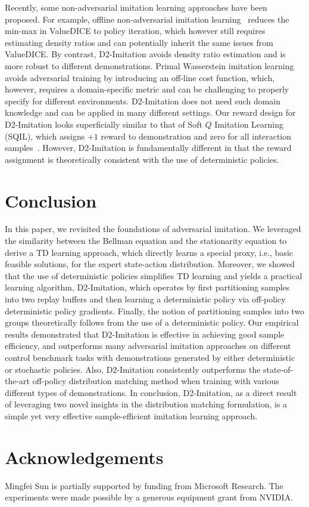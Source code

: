 \documentclass[letterpaper]{article} %
\begin{document}
Recently, some non-adversarial imitation learning approaches have been proposed. 
For example, offline non-adversarial imitation learning~\cite{arenz2020non} reduces the min-max in ValueDICE to policy iteration, 
which however still requires estimating density ratios and can potentially inherit the same issues from ValueDICE.
By contrast, D2-Imitation avoids density ratio estimation and is more robust to different demonstrations. 
Primal Wasserstein imitation learning~\cite{dadashi2020primal} avoids adversarial training by introducing an off-line cost function, 
which, however, requires a domain-specific metric and can be challenging to properly specify for different environments.
D2-Imitation does not need such domain knowledge and can be applied in many different settings.  
Our reward design for D2-Imitation looks superficially similar to that of Soft $Q$ Imitation Learning (SQIL), 
which assigns $+1$ reward to demonstration and zero for all interaction samples~\cite{reddy2019sqil}. 
However, D2-Imitation is fundamentally different in that the reward assignment is theoretically consistent with the use of deterministic policies.


\section{Conclusion}
In this paper, we revisited the foundations of adversarial imitation. 
We leveraged the similarity between the Bellman equation and the stationarity equation to derive a TD learning approach, which directly learns a special proxy, i.e., basic feasible solutions, for the expert state-action distribution. 
Moreover, we showed that the use of deterministic policies simplifies TD learning and yields a practical learning algorithm, 
D2-Imitation, which operates by first partitioning samples into two replay buffers and then learning a deterministic policy via off-policy deterministic policy gradients. 
Finally, the notion of partitioning samples into two groups theoretically follows from the use of a deterministic policy. 
Our empirical results demonstrated that D2-Imitation is effective in achieving good sample efficiency, and outperforms many adversarial imitation approaches on different control benchmark tasks with demonstrations generated by either deterministic or stochastic policies. 
Also, D2-Imitation consistently outperforms the state-of-the-art off-policy distribution matching method when training with various different types of demonstrations. 
In conclusion, D2-Imitation, as a direct result of leveraging two novel insights in the distribution matching formulation, is a simple yet very effective sample-efficient imitation learning approach. 

\section*{Acknowledgements}
Mingfei Sun is partially supported by funding from Microsoft Research. 
The experiments were made possible by a generous equipment grant from NVIDIA. 


\end{document}
